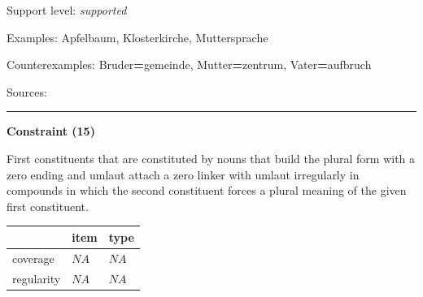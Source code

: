 \vspace{-1.35em}

\noindent
Support level: \textit{supported}

\vspace{0.3em}

\noindent
Examples: Apfel{\zeroLinker}baum, Kloster{\zeroLinker}kirche, Mutter{\zeroLinker}sprache

\noindent
Counterexamples: Bruder\textbf{=}gemeinde, Mutter\textbf{=}zentrum, Vater\textbf{=}aufbruch

\vspace{0.3em}

\noindent
Sources: \citet[83, 106]{ortner_mueller-bollhagen_1991}

\vspace{0.35em}
\hrule




\vspace{0.4em}

\begin{center}
\textbf{Constraint (15)}
\end{center}

\noindent
First constituents that are constituted by nouns that build the plural form with a zero ending and umlaut attach a zero linker with umlaut irregularly in compounds in which the second constituent forces a plural meaning of the given first constituent.
\vspace{0.5em}


\vspace{-0.25em}

\begin{table}[!ht]
\begin{center}
\setlength{\extrarowheight}{1pt}
\begin{tabularx}{\columnwidth}{|X|X|X|}
\hline
 & item & type \\
\hline
 coverage & $NA$ & $NA$ \\
\hline
 regularity & $NA$ & $NA$ \\
\hline
\end{tabularx}
\end{center}
\end{table}

